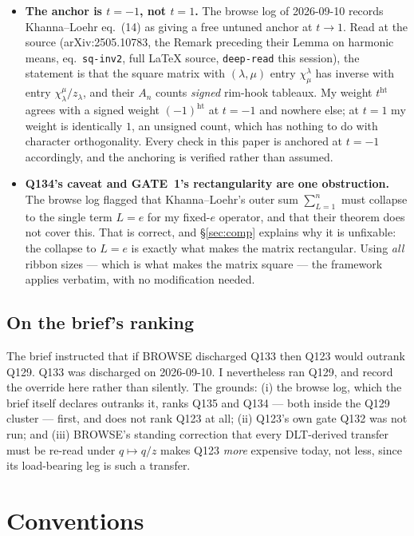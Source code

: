 \documentclass[11pt]{article}
\theoremstyle{definition}
\theoremstyle{remark}
\newcommand{\hgt}{\operatorname{ht}}
\begin{document}
\begin{itemize}
\item \textbf{The anchor is $t=-1$, not $t=1$.}  The browse log of 2026-09-10 records
Khanna--Loehr eq.~(14) as giving a free untuned anchor at $t\to1$.  Read at the source
(arXiv:2505.10783, the Remark preceding their Lemma on harmonic means, eq.~\texttt{sq-inv2},
full \LaTeX{} source, \texttt{deep-read} this session), the statement is that the square
matrix with $(\lambda,\mu)$ entry $\chi^\lambda_\mu$ has inverse with entry
$\chi^\mu_\lambda/z_\lambda$, and their $A_n$ counts \emph{signed} rim-hook tableaux.  My
weight $t^{\hgt}$ agrees with a signed weight $(-1)^{\hgt}$ at $t=-1$ and nowhere else; at
$t=1$ my weight is identically $1$, an unsigned count, which has nothing to do with
character orthogonality.  Every check in this paper is anchored at $t=-1$ accordingly, and
the anchoring is verified rather than assumed.
\item \textbf{Q134's caveat and GATE~1's rectangularity are one obstruction.}  The browse log
flagged that Khanna--Loehr's outer sum $\sum_{L=1}^{n}$ must collapse to the single term
$L=e$ for my fixed-$e$ operator, and that their theorem does not cover this.  That is
correct, and \S\ref{sec:comp} explains why it is unfixable: the collapse to $L=e$ is exactly
what makes the matrix rectangular.  Using \emph{all} ribbon sizes --- which is what makes the
matrix square --- the framework applies verbatim, with no modification needed.
\end{itemize}

\subsection*{On the brief's ranking}
The brief instructed that if BROWSE discharged Q133 then Q123 would outrank Q129.  Q133 was
discharged on 2026-09-10.  I nevertheless ran Q129, and record the override here rather than
silently.  The grounds: (i) the browse log, which the brief itself declares outranks it,
ranks Q135 and Q134 --- both inside the Q129 cluster --- first, and does not rank Q123 at
all; (ii) Q123's own gate Q132 was not run; and (iii) BROWSE's standing correction that every
DLT-derived transfer must be re-read under $q\mapsto q/z$ makes Q123 \emph{more} expensive
today, not less, since its load-bearing leg is such a transfer.

\section{Conventions}
\end{document}
